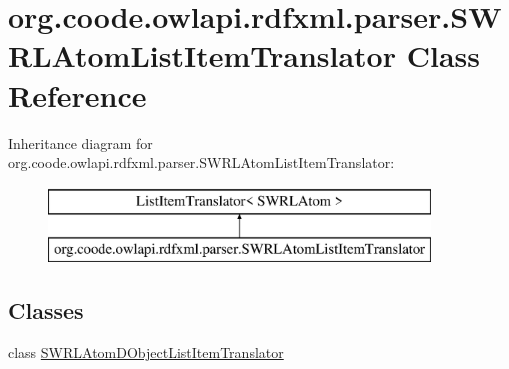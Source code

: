 \hypertarget{classorg_1_1coode_1_1owlapi_1_1rdfxml_1_1parser_1_1_s_w_r_l_atom_list_item_translator}{\section{org.\-coode.\-owlapi.\-rdfxml.\-parser.\-S\-W\-R\-L\-Atom\-List\-Item\-Translator Class Reference}
\label{classorg_1_1coode_1_1owlapi_1_1rdfxml_1_1parser_1_1_s_w_r_l_atom_list_item_translator}
}
Inheritance diagram for org.\-coode.\-owlapi.\-rdfxml.\-parser.\-S\-W\-R\-L\-Atom\-List\-Item\-Translator\-:\begin{figure}[H]
\begin{center}
\leavevmode
\includegraphics[height=2.000000cm]{classorg_1_1coode_1_1owlapi_1_1rdfxml_1_1parser_1_1_s_w_r_l_atom_list_item_translator}
\end{center}
\end{figure}
\subsection*{Classes}
\begin{DoxyCompactItemize}
\item 
class \hyperlink{classorg_1_1coode_1_1owlapi_1_1rdfxml_1_1parser_1_1_s_w_r_l_atom_list_item_translator_1_1_s_w_r_0cbc2fa04ac3facd60666ca299f2b75d}{S\-W\-R\-L\-Atom\-D\-Object\-List\-Item\-Translator}
\end{DoxyCompactItemize}
